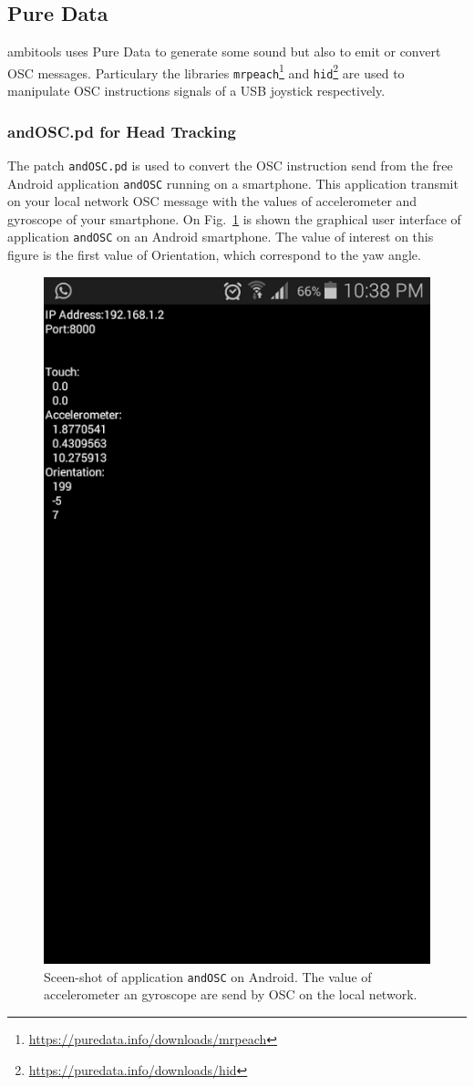 \documentclass[10pt,a4paper]{article}
\begin{document}
\pagebreak
\subsection{Pure Data}
ambitools uses Pure Data to generate some sound but also to emit or convert OSC messages. Particulary the libraries \lstinline'mrpeach'\footnote{\url{https://puredata.info/downloads/mrpeach}} and \lstinline'hid'\footnote{\url{https://puredata.info/downloads/hid}} are used to manipulate OSC instructions signals of a USB joystick respectively.
\subsubsection{andOSC.pd for Head Tracking}
\label{sec:andOSC}
The patch \lstinline'andOSC.pd' is used to convert the OSC instruction send from the free Android application \lstinline'andOSC' running on a smartphone.
This application transmit on your local network OSC message with the values of accelerometer and gyroscope of your smartphone. On Fig.~\ref{fig:andOSC} is shown the graphical user interface of application \lstinline'andOSC' on an Android smartphone. The value of interest on this figure is the first value of Orientation, which correspond to the yaw angle.
\begin{figure}[!ht]
\centering
\includegraphics[width=0.5\columnwidth]{andOSC.png}
\caption{Sceen-shot of application \lstinline'andOSC' on Android. The value of accelerometer an gyroscope are send by OSC on the local network.}
\label{fig:andOSC}
\end{figure}
\end{document}
